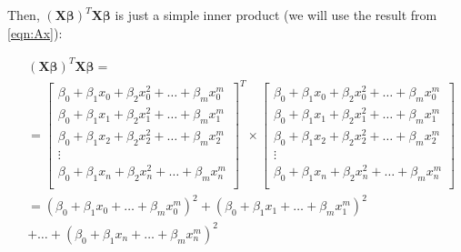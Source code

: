 \documentclass{article}
\newcommand{\X}{\mathbf{X}}
\newcommand{\B}{\boldsymbol\beta} %
\begin{document}
Then, $(\X\B)^T \X\B$ is just a simple inner product (we will use the result from \ref{eqn:Ax}):

\begin{equation} \label{eqn:axtax}
\begin{split}
    & (\X\B)^T \X\B = \\
    & =
    \begin{bmatrix}
        \beta_0 + \beta_1 x_0 + \beta_2 x_0 ^2 + \ldots + \beta_m x_0^m \\
        \beta_0 + \beta_1 x_1 + \beta_2 x_1 ^2 + \ldots + \beta_m x_1^m \\
        \beta_0 + \beta_1 x_2 + \beta_2 x_2 ^2 + \ldots + \beta_m x_2^m \\
        \vdots \\
        \beta_0 + \beta_1 x_n + \beta_2 x_n ^2 + \ldots + \beta_m x_n^m \\
    \end{bmatrix} ^T
    \times
    \begin{bmatrix}
        \beta_0 + \beta_1 x_0 + \beta_2 x_0 ^2 + \ldots + \beta_m x_0^m \\
        \beta_0 + \beta_1 x_1 + \beta_2 x_1 ^2 + \ldots + \beta_m x_1^m \\
        \beta_0 + \beta_1 x_2 + \beta_2 x_2 ^2 + \ldots + \beta_m x_2^m \\
        \vdots \\
        \beta_0 + \beta_1 x_n + \beta_2 x_n ^2 + \ldots + \beta_m x_n^m \\
    \end{bmatrix} \\
    & = (\beta_0 + \beta_1 x_0 + \ldots + \beta_m x_0^m)^ 2 + (\beta_0 + \beta_1 x_1 + \ldots + \beta_m x_1^m)^ 2\\
    & + \ldots + (\beta_0 + \beta_1 x_n + \ldots + \beta_m x_n^m)^ 2
\end{split}
\end{equation}
\end{document}

